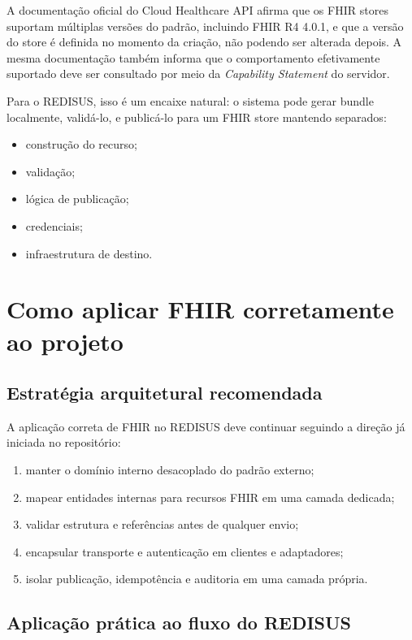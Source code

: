 \documentclass[
    12pt,
    openright,
    oneside,
    a4paper,
    chapter=TITLE,
    section=TITLE,
    brazil,
    sumario=tradicional,
    hidelinks
]{abntex2}
\begin{document}
A documenta\c{c}\~ao oficial do Cloud Healthcare API afirma que os FHIR stores suportam m\'ultiplas vers\~oes do padr\~ao, incluindo FHIR R4 4.0.1, e que a vers\~ao do store \'e definida no momento da cria\c{c}\~ao, n\~ao podendo ser alterada depois. A mesma documenta\c{c}\~ao tamb\'em informa que o comportamento efetivamente suportado deve ser consultado por meio da \textit{Capability Statement} do servidor.

Para o REDISUS, isso \'e um encaixe natural: o sistema pode gerar bundle localmente, valid\'a-lo, e public\'a-lo para um FHIR store mantendo separados:

\begin{itemize}
    \item constru\c{c}\~ao do recurso;
    \item valida\c{c}\~ao;
    \item l\'ogica de publica\c{c}\~ao;
    \item credenciais;
    \item infraestrutura de destino.
\end{itemize}

\chapter{Como aplicar FHIR corretamente ao projeto}

\section{Estrat\'egia arquitetural recomendada}

A aplica\c{c}\~ao correta de FHIR no REDISUS deve continuar seguindo a dire\c{c}\~ao j\'a iniciada no reposit\'orio:

\begin{enumerate}
    \item manter o dom\'inio interno desacoplado do padr\~ao externo;
    \item mapear entidades internas para recursos FHIR em uma camada dedicada;
    \item validar estrutura e refer\^encias antes de qualquer envio;
    \item encapsular transporte e autentica\c{c}\~ao em clientes e adaptadores;
    \item isolar publica\c{c}\~ao, idempot\^encia e auditoria em uma camada pr\'opria.
\end{enumerate}

\section{Aplica\c{c}\~ao pr\'atica ao fluxo do REDISUS}
\end{document}
